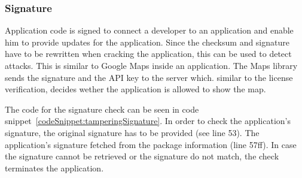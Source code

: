 \subsubsection{Signature} \label{subsection:counter-improve-tampering-signature}
Application code is signed to connect a developer to an application and enable him to provide updates for the application.
Since the checksum and signature have to be rewritten when cracking the application, this can be used to detect attacks.
This is similar to Google Maps inside an application.
The Maps library sends the signature and the API key to the server which. similar to the license verification, decides wether the application is allowed to show the map.
\newline

The code for the signature check can be seen in code snippet~\ref{codeSnippet:tamperingSignature}.
In order to check the application's signature, the original signature has to be provided (see line 53).
The application's signature fetched from the package information (line 57ff).
In case the signature cannot be retrieved or the signature do not match, the check terminates the application.
